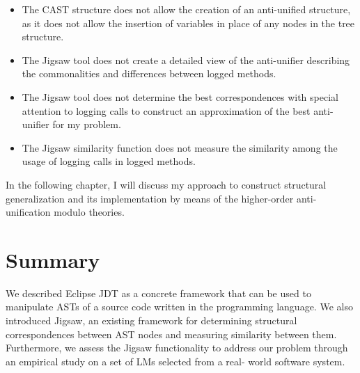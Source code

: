 \begin{itemize} [leftmargin=.5in]
\item The CAST structure does not allow the creation of an anti-unified structure, as it does not allow the insertion of variables in place of any nodes in the tree structure.
\item The Jigsaw tool does not create a detailed view of the anti-unifier describing the commonalities and differences between logged methods.
\item The Jigsaw tool does not determine the best correspondences with special attention to logging calls to construct an approximation of the best anti-unifier for my problem.
\item The Jigsaw similarity function does not measure the similarity among the usage of logging calls in logged methods.
\end{itemize}

In the following chapter, I will discuss my approach to construct structural generalization and its implementation by means of the higher-order anti-unification modulo theories.

\section{Summary}  \label{summary}
We described Eclipse JDT as a concrete framework that can be used  to manipulate ASTs of a source code written in the  programming language. We also introduced Jigsaw, an existing framework for determining structural correspondences between AST nodes and measuring similarity between them. Furthermore, we assess the Jigsaw functionality to address our problem through an empirical study on a set of LMs selected from a real- world software system.





